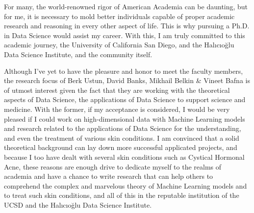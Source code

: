 	For many, the world-renowned rigor of American Academia can be daunting, but for me, it is necessary to mold better individuals capable 
	of proper academic research and reasoning in every other aspect of life. This is why pursuing a Ph.D. in Data Science would assist
	my career. With this, I am truly committed to this academic journey, the University of California San Diego, and the Halıcıoğlu
	Data Science Institute, and the community itself. 
	
	Although I've yet to have the pleasure and honor to meet the faculty members, the research focus of Berk Ustun, David Banks, 
	Mikhail Belkin \& Vineet Bafna is of utmost interest given the fact that they are working with the theoretical aspects
	of Data Science, the applications of Data Science to support science and medicine. With the former, if my acceptance is
	considered, I would be very pleased if I could work on high-dimensional data with Machine Learning models and research
	related to the applications of Data Science for the understanding, and even the treatment of various skin 
	conditions. I am convinced that a solid theoretical background can lay down more successful applicated projects, 
	and because I too have dealt with several skin conditions such as Cystical Hormonal Acne, these reasons
	are enough drive to dedicate myself to the realms of academia and have a chance to write research
	that can help others to comprehend the complex and marvelous theory of Machine Learning models and
	to treat such skin conditions, and all of this in the reputable institution of the UCSD and the Halıcıoğlu Data Science Institute.
